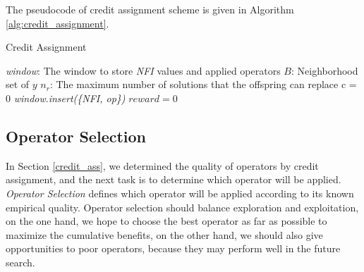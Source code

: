 \documentclass[journal]{IEEEtran}
\begin{document}
The pseudocode of credit assignment scheme is given in Algorithm \ref{alg:credit_assignment}.
\begin{algorithm}[t]
  \label{alg:credit_assignment}
  \caption{Credit Assignment}
  \small
  \textit{window}: The window to store \textit{NFI} values and applied operators\;  %
  $B$: Neighborhood set of $y$\;
  $n_r$: The maximum number of solutions that the offspring can replace\;
  c = 0\;  %
  \textit{window}.\textit{insert(\{NFI, op\})}\;
  $\textit{reward} = 0$\;
  \;
\end{algorithm}

\subsection{Operator Selection \label{operator_selection}}
In Section \ref{credit_ass}, we determined the quality of operators by credit assignment, and the next task is to determine which operator will be applied. \textit{Operator Selection} defines which operator will be applied according to its known empirical quality.
Operator selection should balance exploration and exploitation, on the one hand, we hope to choose the best operator as far as possible to maximize the cumulative benefits, on the other hand, we should also give opportunities to poor operators, because they may perform well in the future search.
\end{document}

